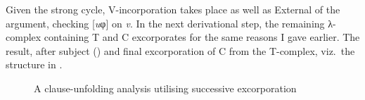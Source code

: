 \documentclass[output=paper]{langsci/langscibook}
\begin{document}
Given the strong cycle, V-incorporation takes place as well as
External  of the argument, checking [\emph{u}φ] on
\emph{v}. In the next derivational step, the remaining λ-complex
containing T and C excorporates for the same reasons I gave
earlier. The result, after subject  (\Sbj) and final excorporation
of C from the T-complex, viz.\ the structure in .

\begin{figure}
\caption{A clause-unfolding analysis utilising successive excorporation
\parencite{Shimada:2007}\label{fig:18.1}}
\end{figure}
\end{document}
